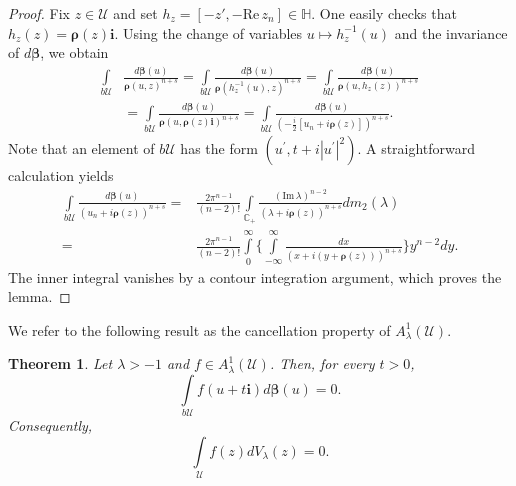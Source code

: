 \documentclass{amsart}
\newtheorem{theorem}{Theorem}[section]
\numberwithin{equation}{section}
\newcommand{\RePt}{\mathrm{Re}\,}
\newcommand{\ImPt}{\mathrm{Im}\,}
\newcommand{\calU}{\mathcal{U}}
\newcommand{\bfi}{\mathbf{i}}
\newcommand{\bfbeta}{\boldsymbol{\beta}}
\newcommand{\bfrho}{\boldsymbol{\rho}}
\newcommand{\bbC}{\mathbb{C}}
\newcommand{\bbH}{\mathbb{H}}
\newcommand{\bSieg}{b\mathcal{U}}
\begin{document}
\begin{proof}
Fix $z\in\calU$ and set $h_z=[-z',-\RePt z_n]\in\bbH$. One easily checks that $h_z(z) = \bfrho(z) \bfi$.
Using the change of variables $u\mapsto h_z^{-1}(u)$ and the invariance of $d\bfbeta$, we obtain
\begin{align*}\label{eqn:cancl1}
\int\limits_{\bSieg} &\frac {d\bfbeta(u)} {\bfrho(u,z)^{n+s}}
= \int\limits_{\bSieg} \frac {d\bfbeta(u)} {\bfrho(h^{-1}_z(u), z)^{n+s}}
= \int\limits_{\bSieg} \frac {d\bfbeta(u)} {\bfrho(u, h_z(z))^{n+s}}\\
&=  \int\limits_{\bSieg} \frac {d\bfbeta(u)} {\bfrho(u, \bfrho(z)\bfi)^{n+s}}
= \int\limits_{\bSieg} \frac {d\bfbeta(u)} {(-\frac{i}{2} [ u_n + i \bfrho(z) ])^{n+s}}.
\end{align*}
Note that an element of $\bSieg$ has the form $(u^{\prime}, t + i|u^{\prime}|^2)$. A straightforward calculation yields
\begin{align*}
\int\limits_{\bSieg} \frac {d\bfbeta(u)} {(  u_n + i \bfrho(z) )^{n+s}}
=& \frac { 2\pi^{n-1}} {(n-2)!} \int\limits_{\bbC_{+}} \frac {(\ImPt \lambda)^{n-2}}
{(\lambda +i\bfrho(z))^{n+s}} dm_2(\lambda)\\
=& \frac { 2\pi^{n-1}} {(n-2)!}  \int\limits_{0}^{\infty} \bigg\{\int\limits_{-\infty}^{\infty}
\frac {dx} {(x+i(y+\bfrho(z)))^{n+s}} \bigg\} y^{n-2} dy.
\end{align*}
The inner integral vanishes by a contour integration argument, which proves the lemma.
\end{proof}

We refer to the following result as the cancellation property of $A_{\lambda}^1(\calU)$.

\begin{theorem}\label{thm:cancellation}
Let $\lambda>-1$ and $f\in A_{\lambda}^1(\calU)$. Then, for every $t>0$,
\[
\int\limits_{\bSieg} f(u+t\bfi) d\bfbeta(u)=0.
\]
Consequently,
\[
\int\limits_{\calU} f(z) dV_{\lambda}(z) =0.
\]
\end{theorem}
\end{document}
